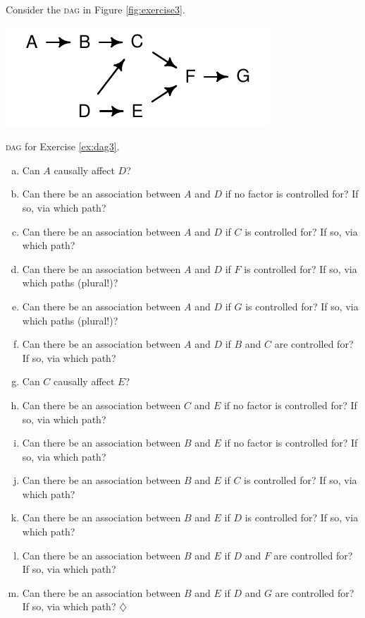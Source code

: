 \documentclass[a4paper]{tufte-book}\usepackage[]{graphicx}\usepackage[]{xcolor}
\newcommand*{\parend}[1][$\diamondsuit$]{%
\leavevmode\unskip\penalty9999 \hbox{}\nobreak\hfill
    \quad\hbox{#1}%
}
\begin{document}
Consider the \textsc{dag} in Figure \ref{fig:exercise3}.\label{ex:dag3}
\begin{marginfigure}[3cm]
\includegraphics[width=\textwidth]{figure/exercise3}
\caption{\textsc{dag} for Exercise \ref{ex:dag3}.}
\label{fig:exercise3}
\end{marginfigure}
  \begin{enumerate}[(a)]
    \item Can $A$ causally affect $D$?
    \item Can there be an association between $A$ and $D$
    if no factor is controlled for? If so, via which path?
    \item Can there be an association between $A$ and $D$
    if $C$ is controlled for? If so, via which path?
    \item Can there be an association between $A$ and $D$
    if $F$ is controlled for? If so, via which paths (plural!)?
    \item Can there be an association between $A$ and $D$
    if $G$ is controlled for? If so, via which paths (plural!)?
    \item Can there be an association between $A$ and $D$
    if $B$ and $C$ are controlled for? If so, via which path?

    \item Can $C$ causally affect $E$?
    \item Can there be an association between $C$ and $E$
    if no factor is controlled for? If so, via which path?
    \item Can there be an association between $B$ and $E$
    if no factor is controlled for? If so, via which path?
    \item Can there be an association between $B$ and $E$
    if $C$ is controlled for? If so, via which path?
    \item Can there be an association between $B$ and $E$
    if $D$ is controlled for? If so, via which path?
    \item Can there be an association between $B$ and $E$
    if $D$ and $F$ are controlled for? If so, via which path?
    \item Can there be an association between $B$ and $E$
    if $D$ and $G$ are controlled for? If so, via which path? \parend
  \end{enumerate}
  
\end{document}
